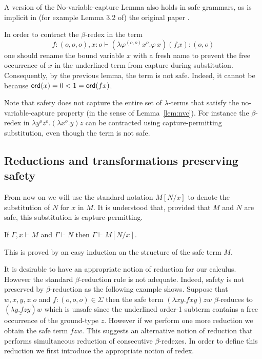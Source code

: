 \documentclass{llncs}
\newcommand\subst[2]{\left[ #1/#2 \right]}
\begin{document}
\begin{remark}
  A version of the No-variable-capture Lemma also holds in safe
  grammars, as is implicit in (for example Lemma 3.2 of) the original
  paper \cite{KNU02}.
\end{remark}

\begin{example}
  In order to contract the $\beta$-redex in the term
\[f:(o,o,o),x:o
  \vdash (\lambda \varphi^{(o,o)} x^o . \varphi \, x) (\underline{f \,
    x}) : (o,o)\] one should rename the bound variable $x$ with a fresh name to
  prevent the free occurrence of $x$ in the underlined term from
  capture during substitution. Consequently, by the previous lemma,
  the term is not safe. Indeed, it cannot be because ${\sf ord}(x) = 0 < 1
  = {\sf ord}(f x)$.
\end{example}

Note that safety does not capture the entire set of $\lambda$-terms
that satisfy the no-variable-capture property (in the sense of
Lemma~\ref{lem:nvc}). For instance the $\beta$-redex in $\lambda y^o
z^o. (\lambda x^o .y) z$ can be contracted using capture-permitting
substitution, even though the term is not safe.

\subsection*{Reductions and transformations preserving safety}

From now on we will use the standard notation $M\subst{N}{x}$ to
denote the substitution of $N$ for $x$ in $M$.  It is understood that,
provided that $M$ and $N$ are safe, this substitution is
capture-permitting.


\begin{lemma}
\label{lem:subst_preserve_safety}
If $\Gamma, x \vdash M$ and $\Gamma \vdash N$ then $\Gamma \vdash M[N/x]$.
\end{lemma}
This is proved by an easy induction on the structure of the safe term $M$.


It is desirable to have an appropriate notion of reduction for our
calculus. However the standard $\beta$-reduction rule is not
adequate. Indeed, safety is not preserved by $\beta$-reduction as the
following example shows. Suppose that $w,x,y,z : o$ and $f : (o,o,o)
\in \Sigma$ then the safe term $(\lambda x y . f x y) z w$
$\beta$-reduces to $(\underline{\lambda y . f z y}) w$ which is unsafe
since the underlined order-1 subterm contains a free occurrence of the
ground-type $z$. However if we perform one more reduction we obtain
the safe term $f z w$. This suggests an alternative notion of
reduction that performs simultaneous reduction of consecutive
$\beta$-redexes. In order to define this reduction we first introduce
the appropriate notion of redex.
\end{document}
